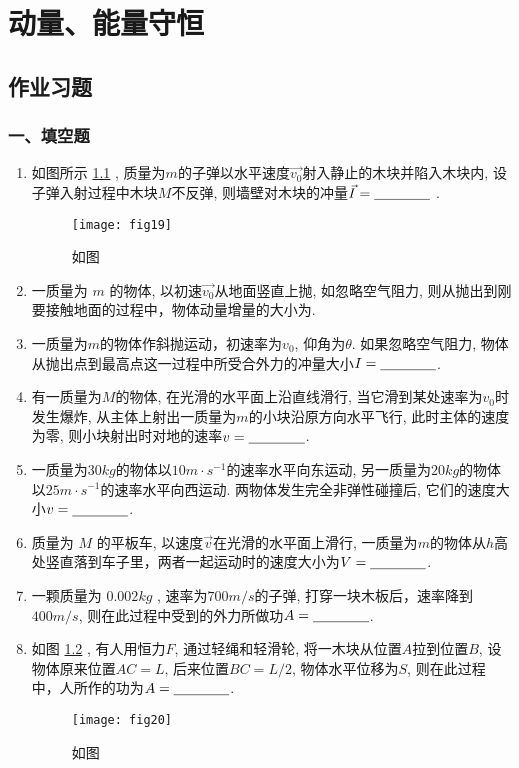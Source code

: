 \chapter{动量、能量守恒}
\section{作业习题}
\subsection*{一、填空题}
\begin{enumerate}
    \item 如图所示 \ref{fig:19} , 质量为$m$的子弹以水平速度$\vec{v_0}$射入静止的木块并陷入木块内, 
    设子弹入射过程中木块$M$不反弹, 则墙壁对木块的冲量$\vec{I}=\nl$ .
    \begin{figure}[H]
        \centering
        \texttt{[image: fig19]}
            \caption{如图}\label{fig:19}
    \end{figure}
    \item 一质量为 $m$ 的物体, 以初速$\vec{v_0}$从地面竖直上抛, 如忽略空气阻力, 则从抛出到刚要接触地面的过程中，物体动量增量的大小为\nl .
    \item 一质量为$m$的物体作斜抛运动，初速率为$v_0$, 仰角为$\theta$. 如果忽略空气阻力, 物体从抛出点到最高点这一过程中所受合外力的冲量大小$I=\nl$.
    \item 有一质量为$M$的物体, 在光滑的水平面上沿直线滑行, 当它滑到某处速率为$v_0$时发生爆炸, 从主体上射出一质量为$m$的小块沿原方向水平飞行, 此时主体的速度为零, 则小块射出时对地的速率$v=\nl$.
    \item 一质量为$30 kg$的物体以$10m\cdot s^{-1}$的速率水平向东运动, 另一质量为$20 kg$的物体以$25 m\cdot s^{-1}$的速率水平向西运动. 两物体发生完全非弹性碰撞后, 它们的速度大小$v=\nl$.
    \item 质量为 $M$ 的平板车, 以速度$\vec{v}$在光滑的水平面上滑行, 一质量为$m$的物体从$h$高处竖直落到车子里，两者一起运动时的速度大小为$V=\nl$.
    \item 一颗质量为 $0.002kg$ , 速率为$700 m/s$的子弹, 打穿一块木板后，速率降到$400 m/s$, 则在此过程中受到的外力所做功$A=\nl$.
    \item 如图 \ref{fig:20} , 有人用恒力$F$, 通过轻绳和轻滑轮, 将一木块从位置$A$拉到位置$B$, 设物体原来位置$AC=L$, 后来位置$BC=L/2$, 物体水平位移为$S$, 则在此过程中，人所作的功为$A=\nl$.
    \begin{figure}[H]
        \centering
        \texttt{[image: fig20]}
            \caption{如图}\label{fig:20}

\end{figure}
\end{enumerate}
